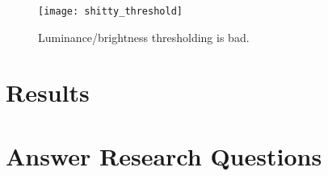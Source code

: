 \begin{figure} \centering
	\texttt{[image: shitty\_threshold]}
	\caption{Luminance/brightness thresholding is bad.}
	\label{fig:color-thresholding-sucks}
\end{figure}


\section{Results}


\section{Answer Research Questions}